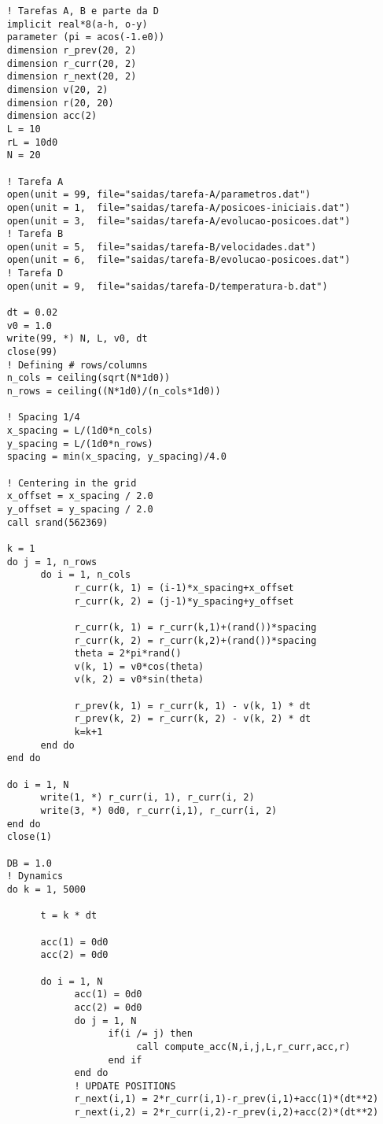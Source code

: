 \begin{verbatim}
    ! Tarefas A, B e parte da D
    implicit real*8(a-h, o-y)
    parameter (pi = acos(-1.e0))
    dimension r_prev(20, 2)
    dimension r_curr(20, 2)
    dimension r_next(20, 2)
    dimension v(20, 2)
    dimension r(20, 20)
    dimension acc(2)
    L = 10
    rL = 10d0
    N = 20

    ! Tarefa A 
    open(unit = 99, file="saidas/tarefa-A/parametros.dat")
    open(unit = 1,  file="saidas/tarefa-A/posicoes-iniciais.dat")
    open(unit = 3,  file="saidas/tarefa-A/evolucao-posicoes.dat")
    ! Tarefa B 
    open(unit = 5,  file="saidas/tarefa-B/velocidades.dat")
    open(unit = 6,  file="saidas/tarefa-B/evolucao-posicoes.dat")
    ! Tarefa D
    open(unit = 9,  file="saidas/tarefa-D/temperatura-b.dat")
    
    dt = 0.02
    v0 = 1.0
    write(99, *) N, L, v0, dt
    close(99)
    ! Defining # rows/columns 
    n_cols = ceiling(sqrt(N*1d0))
    n_rows = ceiling((N*1d0)/(n_cols*1d0)) 
    
    ! Spacing 1/4 
    x_spacing = L/(1d0*n_cols)
    y_spacing = L/(1d0*n_rows)
    spacing = min(x_spacing, y_spacing)/4.0 
    
    ! Centering in the grid
    x_offset = x_spacing / 2.0 
    y_offset = y_spacing / 2.0
    call srand(562369)
    
    k = 1 
    do j = 1, n_rows 
          do i = 1, n_cols 
                r_curr(k, 1) = (i-1)*x_spacing+x_offset
                r_curr(k, 2) = (j-1)*y_spacing+y_offset
                
                r_curr(k, 1) = r_curr(k,1)+(rand())*spacing
                r_curr(k, 2) = r_curr(k,2)+(rand())*spacing
                theta = 2*pi*rand()
                v(k, 1) = v0*cos(theta)
                v(k, 2) = v0*sin(theta)
                
                r_prev(k, 1) = r_curr(k, 1) - v(k, 1) * dt 
                r_prev(k, 2) = r_curr(k, 2) - v(k, 2) * dt 
                k=k+1
          end do 
    end do

    do i = 1, N
          write(1, *) r_curr(i, 1), r_curr(i, 2) 
          write(3, *) 0d0, r_curr(i,1), r_curr(i, 2)
    end do
    close(1)

    DB = 1.0
    ! Dynamics 
    do k = 1, 5000

          t = k * dt 

          acc(1) = 0d0 
          acc(2) = 0d0

          do i = 1, N 
                acc(1) = 0d0 
                acc(2) = 0d0
                do j = 1, N 
                      if(i /= j) then
                           call compute_acc(N,i,j,L,r_curr,acc,r)
                      end if
                end do 
                ! UPDATE POSITIONS
                r_next(i,1) = 2*r_curr(i,1)-r_prev(i,1)+acc(1)*(dt**2)
                r_next(i,2) = 2*r_curr(i,2)-r_prev(i,2)+acc(2)*(dt**2) 


\end{verbatim}
